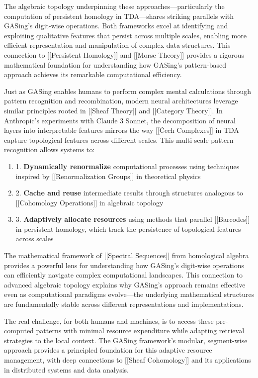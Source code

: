 \documentclass[11pt,a4paper]{article}
\begin{document}
The algebraic topology underpinning these approaches—particularly the computation of persistent homology in TDA—shares striking parallels with GASing's digit-wise operations. Both frameworks excel at identifying and exploiting qualitative features that persist across multiple scales, enabling more efficient representation and manipulation of complex data structures. This connection to [[Persistent Homology]] and [[Morse Theory]] provides a rigorous mathematical foundation for understanding how GASing's pattern-based approach achieves its remarkable computational efficiency.

Just as GASing enables humans to perform complex mental calculations through pattern recognition and recombination, modern neural architectures leverage similar principles rooted in [[Sheaf Theory]] and [[Category Theory]]. In Anthropic's experiments with Claude 3 Sonnet, the decomposition of neural layers into interpretable features mirrors the way [[Čech Complexes]] in TDA capture topological features across different scales. This multi-scale pattern recognition allows systems to:

\begin{enumerate}
  \item 1. \textbf{Dynamically renormalize} computational processes using techniques inspired by [[Renormalization Groups]] in theoretical physics
  \item 2. \textbf{Cache and reuse} intermediate results through structures analogous to [[Cohomology Operations]] in algebraic topology
  \item 3. \textbf{Adaptively allocate resources} using methods that parallel [[Barcodes]] in persistent homology, which track the persistence of topological features across scales
\end{enumerate}

The mathematical framework of [[Spectral Sequences]] from homological algebra provides a powerful lens for understanding how GASing's digit-wise operations can efficiently navigate complex computational landscapes. This connection to advanced algebraic topology explains why GASing's approach remains effective even as computational paradigms evolve—the underlying mathematical structures are fundamentally stable across different representations and implementations.

The real challenge, for both humans and machines, is to access these pre-computed patterns with minimal resource expenditure while adapting retrieval strategies to the local context. The GASing framework's modular, segment-wise approach provides a principled foundation for this adaptive resource management, with deep connections to [[Sheaf Cohomology]] and its applications in distributed systems and data analysis.
\end{document}
